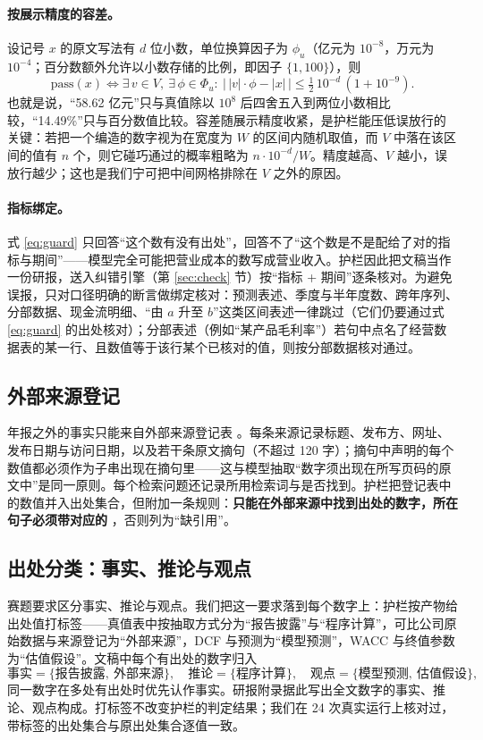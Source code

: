 \paragraph{按展示精度的容差。}设记号 $x$ 的原文写法有 $d$ 位小数，单位换算因子为 $\phi_u$（亿元为 $10^{-8}$，万元为 $10^{-4}$；百分数额外允许以小数存储的比例，即因子 $\{1, 100\}$），则
\begin{equation}
  \mathrm{pass}(x) \iff \exists\, v\in V,\ \exists\,\phi\in\Phi_u:\ \bigl|\,|v|\cdot\phi - |x|\,\bigr| \le \tfrac12\,10^{-d}\,(1+10^{-9}) .
  \label{eq:guard}
\end{equation}
也就是说，“58.62 亿元”只与真值除以 $10^8$ 后四舍五入到两位小数相比较，“14.49\%”只与百分数值比较。容差随展示精度收紧，是护栏能压低误放行的关键：若把一个编造的数字视为在宽度为 $W$ 的区间内随机取值，而 $V$ 中落在该区间的值有 $n$ 个，则它碰巧通过的概率粗略为 $n\cdot 10^{-d}/W$。精度越高、$V$ 越小，误放行越少；这也是我们宁可把中间网格排除在 $V$ 之外的原因。

\paragraph{指标绑定。}式 \eqref{eq:guard} 只回答“这个数有没有出处”，回答不了“这个数是不是配给了对的指标与期间”——模型完全可能把营业成本的数写成营业收入。护栏因此把文稿当作一份研报，送入纠错引擎（第 \ref{sec:check} 节）按“指标 + 期间”逐条核对。为避免误报，只对口径明确的断言做绑定核对：预测表述、季度与半年度数、跨年序列、分部数据、现金流明细、“由 $a$ 升至 $b$”这类区间表述一律跳过（它们仍要通过式 \eqref{eq:guard} 的出处核对）；分部表述（例如“某产品毛利率”）若句中点名了经营数据表的某一行、且数值等于该行某个已核对的值，则按分部数据核对通过。

\subsection{外部来源登记}
\label{sec:sources}
年报之外的事实只能来自外部来源登记表 。每条来源记录标题、发布方、网址、发布日期与访问日期，以及若干条原文摘句（不超过 120 字）；摘句中声明的每个数值都必须作为子串出现在摘句里——这与模型抽取“数字须出现在所写页码的原文中”是同一原则。每个检索问题还记录所用检索词与是否找到。护栏把登记表中的数值并入出处集合，但附加一条规则：\textbf{只能在外部来源中找到出处的数字，所在句子必须带对应的 \code{[S编号]}}，否则列为“缺引用”。

\subsection{出处分类：事实、推论与观点}
赛题要求区分事实、推论与观点。我们把这一要求落到每个数字上：护栏按产物给出处值打标签——真值表中按抽取方式分为“报告披露”与“程序计算”，可比公司原始数据与来源登记为“外部来源”，DCF 与预测为“模型预测”，WACC 与终值参数为“估值假设”。文稿中每个有出处的数字归入
\[
  \text{事实}=\{\text{报告披露},\ \text{外部来源}\},\quad \text{推论}=\{\text{程序计算}\},\quad \text{观点}=\{\text{模型预测},\ \text{估值假设}\},
\]
同一数字在多处有出处时优先认作事实。研报附录据此写出全文数字的事实、推论、观点构成。打标签不改变护栏的判定结果；我们在 24 次真实运行上核对过，带标签的出处集合与原出处集合逐值一致。

